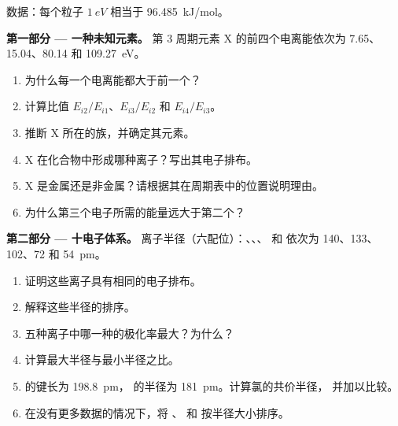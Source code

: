 \begin{problem}
\label{pb:b1:periodicity:1}
数据：每个粒子 $\qty{1}{eV}$ 相当于 \qty{96.485}{kJ/mol}。

\medskip
\noindent\textbf{第一部分 --- 一种未知元素。}
第 3 周期元素 X 的前四个电离能依次为 7.65、
15.04、80.14 和 \qty{109.27}{eV}。
\begin{enumerate}
  \item 为什么每一个电离能都大于前一个？
  \item 计算比值 $E_{i2}/E_{i1}$、$E_{i3}/E_{i2}$ 和
        $E_{i4}/E_{i3}$。
  \item 推断 X 所在的族，并确定其元素。
  \item X 在化合物中形成哪种离子？写出其电子排布。
  \item X 是金属还是非金属？请根据其在周期表中的位置说明理由。
  \item 为什么第三个电子所需的能量远大于第二个？
\end{enumerate}

\medskip
\noindent\textbf{第二部分 --- 十电子体系。}
离子半径（六配位）：、、、
 和  依次为 140、133、102、72 和 \qty{54}{pm}。
\begin{enumerate}[resume]
  \item 证明这些离子具有相同的电子排布。
  \item 解释这些半径的排序。
  \item 五种离子中哪一种的极化率最大？为什么？
  \item 计算最大半径与最小半径之比。
  \item {} 的键长为 \qty{198.8}{pm}，
         的半径为 \qty{181}{pm}。计算氯的共价半径，
        并加以比较。
  \item 在没有更多数据的情况下，将 、 和 
        按半径大小排序。
\end{enumerate}


\end{problem}
